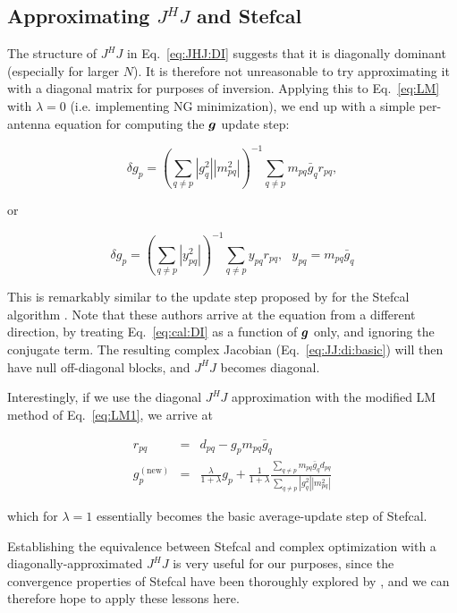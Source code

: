 \documentclass[useAMS,usenatbib]{mn2e}
\newcommand{\JJ}{J} %
\begin{document}
\subsection{Approximating $\JJ^H\JJ$ and Stefcal}

The structure of $\JJ^H\JJ$ in Eq.~\ref{eq:JHJ:DI} suggests that it is diagonally dominant (especially 
for larger $N$). It is therefore not unreasonable to try approximating it with a diagonal matrix for purposes 
of inversion. Applying this to Eq.~\ref{eq:LM} with $\lambda=0$ (i.e. implementing NG minimization), we end up
with a simple per-antenna equation for computing the $\bmath{g}$ update step:

\begin{equation}
\delta g_p = \left( \sum\limits_{q\ne p} |g^2_{q}| |m^2_{pq}| \right )^{-1} \sum\limits_{q\ne p} m_{pq}\bar{g}_q r_{pq},
\end{equation}

or

\begin{equation}
\label{eq:JHJ:diag}
\delta g_p = \left( \sum\limits_{q\ne p} |y^2_{pq}| \right )^{-1} \sum\limits_{q\ne p} y_{pq} r_{pq},~~~y_{pq}=m_{pq}\bar{g}_q
\end{equation}

This is remarkably similar to the update step proposed by \citet{Stefcal} for the Stefcal algorithm \citep[and earlier 
implemented in the RTS system by][]{Mitchell-RTS}. Note that these authors arrive at the equation from a different 
direction, by treating Eq.~\ref{eq:cal:DI} as a function of $\bmath{g}$ only, and ignoring the conjugate term. The 
resulting complex Jacobian (Eq.~\ref{eq:JJ:di:basic}) will then have null off-diagonal blocks, and $\JJ^H\JJ$ becomes 
diagonal.

Interestingly, if we use the diagonal $\JJ^H\JJ$ approximation with the modified LM method of Eq.~\ref{eq:LM1}, we arrive at

\begin{eqnarray*}
r_{pq} &=& d_{pq} - g_p m_{pq} \bar{g}_q \\
g_p^\mathrm{(new)} &=& \frac{\lambda}{1+\lambda}g_p + \frac{1}{1+\lambda} \frac{\sum\limits_{q\ne p} m_{pq}\bar{g}_q d_{pq}}{\sum\limits_{q\ne p} |g^2_{q}| |m^2_{pq}|}
\end{eqnarray*}

which for $\lambda=1$ essentially becomes the basic average-update step of Stefcal.

Establishing the equivalence between Stefcal and complex optimization with a diagonally-approximated $\JJ^H\JJ$ is 
very useful for our purposes, since the convergence properties of Stefcal have been thoroughly explored 
by \citet{Stefcal}, and we can therefore hope to apply these lessons here.
\end{document}

